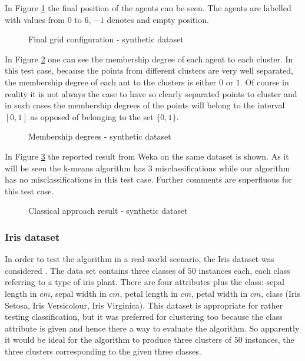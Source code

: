 In Figure \ref{testDs_grid} the final position of the agents can be seen. The agents are labelled with values from $0$ to $6$, $-1$ denotes and empty position.
\begin{figure}[h!]
\centerline{}
      \caption{Final grid configuration - synthetic dataset}
\label{testDs_grid}
\end{figure}


In Figure \ref{testDs_membership} one can see the membership degree of each agent to each cluster. In this test case, because the points from different clusters are very well separated, the membership degree of each ant to the clusters is either $0$ or $1$. Of course in reality it is not always the case to have so clearly separated points to cluster and in such cases the membership degrees of the points will belong to the interval $[0, 1]$ as opposed of belonging to the set $\{0, 1\}$.
\begin{figure}[h!]
\centerline{}
      \caption{Membership degrees - synthetic dataset}
\label{testDs_membership}
\end{figure}

In Figure \ref{weka_customds} the reported result from Weka \cite{Hall09Weka} on the same dataset is shown.  As it will be seen the k-means algorithm has 3 misclassifications while our algorithm has no misclassifications in this test case. Further comments are superfluous for this test case.

\begin{figure}[h!]
\centerline{}
      \caption{Classical approach result - synthetic dataset}
\label{weka_customds}
\end{figure}

\subsubsection{Iris dataset}

In order to test the algorithm in a real-world scenario, the Iris dataset was considered \cite{website:iris}. The data set contains three classes of $50$ instances each, each class referring to a type of iris plant. There are four attributes plus the class: sepal length in $cm$, sepal width in $cm$, petal length in $cm$, petal width in $cm$, class (Iris Setosa, Iris Versicolour, Iris Virginica). This dataset is appropriate for rather testing classification, but it was preferred for clustering too because the class attribute is given and hence there a way to evaluate the algorithm. So apparently it would be ideal for the algorithm to produce three clusters of $50$ instances, the three clusters corresponding to the given three classes. 

